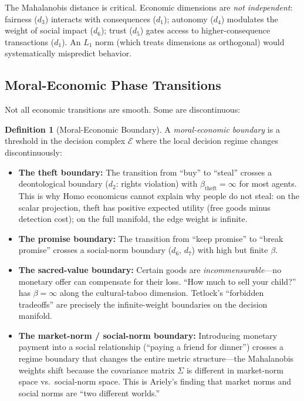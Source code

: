 \documentclass[12pt]{article}
\theoremstyle{definition}
\newtheorem{definition}[theorem]{Definition}
\theoremstyle{remark}
\newcommand{\E}{\mathcal{E}}               %
\begin{document}
The Mahalanobis distance is critical.  Economic dimensions are \emph{not independent}: fairness ($d_3$) interacts with consequences ($d_1$); autonomy ($d_4$) modulates the weight of social impact ($d_6$); trust ($d_5$) gates access to higher-consequence transactions ($d_1$).  An $L_1$ norm (which treats dimensions as orthogonal) would systematically mispredict behavior.

\subsection{Moral-Economic Phase Transitions}

Not all economic transitions are smooth.  Some are discontinuous:

\begin{definition}[Moral-Economic Boundary]
\label{def:boundary}
A \emph{moral-economic boundary} is a threshold in the decision complex $\E$ where the local decision regime changes discontinuously:
\begin{itemize}
    \item \textbf{The theft boundary:} The transition from ``buy'' to ``steal'' crosses a deontological boundary ($d_2$: rights violation) with $\beta_{\text{theft}} = \infty$ for most agents.  This is why Homo economicus cannot explain why people do not steal: on the scalar projection, theft has positive expected utility (free goods minus detection cost); on the full manifold, the edge weight is infinite.
    \item \textbf{The promise boundary:} The transition from ``keep promise'' to ``break promise'' crosses a social-norm boundary ($d_6$, $d_7$) with high but finite $\beta$.
    \item \textbf{The sacred-value boundary:} Certain goods are \emph{incommensurable}---no monetary offer can compensate for their loss.  ``How much to sell your child?'' has $\beta = \infty$ along the cultural-taboo dimension.  Tetlock's ``forbidden tradeoffs'' \cite{tetlock2000} are precisely the infinite-weight boundaries on the decision manifold.
    \item \textbf{The market-norm / social-norm boundary:} Introducing monetary payment into a social relationship (``paying a friend for dinner'') crosses a regime boundary that changes the entire metric structure---the Mahalanobis weights shift because the covariance matrix $\Sigma$ is different in market-norm space vs.\ social-norm space.  This is Ariely's \cite{ariely2008} finding that market norms and social norms are ``two different worlds.''
\end{itemize}
\end{definition}
\end{document}
